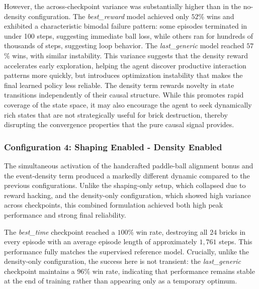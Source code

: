 \documentclass[12pt,a4paper]{report}
\begin{document}
However, the across-checkpoint variance was substantially higher than in the no-density configuration. The \textit{best\_reward} model achieved only $52$\% wins and exhibited a characteristic bimodal failure pattern: some episodes terminated in under 100 steps, suggesting immediate ball loss, while others ran for hundreds of thousands of steps, suggesting loop behavior. The \textit{last\_generic} model reached $57$\% wins, with similar instability. This variance suggests that the density reward accelerates early exploration, helping the agent discover productive interaction patterns more quickly, but introduces optimization instability that makes the final learned policy less reliable.
The density term rewards novelty in state transitions independently of their causal structure. While this promotes rapid coverage of the state space, it may also encourage the agent to seek dynamically rich states that are not strategically useful for brick destruction, thereby disrupting the convergence properties that the pure causal signal provides.

\subsubsection{Configuration 4: Shaping Enabled - Density Enabled}
The simultaneous activation of the handcrafted paddle-ball alignment bonus and the event-density term produced a markedly different dynamic compared to the previous configurations. Unlike the shaping-only setup, which collapsed due to reward hacking, and the density-only configuration, which showed high variance across checkpoints, this combined formulation achieved both high peak performance and strong final reliability.

The \textit{best\_time} checkpoint reached a $100$\% win rate, destroying all $24$ bricks in every episode with an average episode length of approximately $1,761$ steps. This performance fully matches the supervised reference model. Crucially, unlike the density-only configuration, the success here is not transient: the \textit{last\_generic} checkpoint maintains a $96$\% win rate, indicating that performance remains stable at the end of training rather than appearing only as a temporary optimum.
\end{document}
